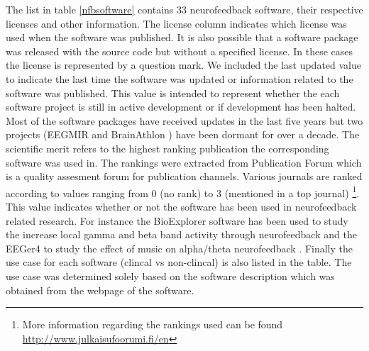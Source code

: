 The list in table \ref{nfbsoftware} contains 33 neurofeedback software, their respective licenses and other information. The license column indicates which license was used when the software was published. It is also possible that a software package was released with the source code but without a specified license. In these cases the license is represented by a question mark. We included the last updated value to indicate the last time the software was updated or information related to the software was published. This value is intended to represent whether the each software project is still in active development or if development has been halted. Most of the software packages have received updates in the last five years but two projects (EEGMIR and BrainAthlon \cite{palke2004brainathlon}) have been dormant for over a decade. The scientific merit refers to the highest ranking publication the corresponding software was used in. The rankings were extracted from Publication Forum which is a quality assesment forum for publication channels. Various journals are ranked according to values ranging from 0 (no rank) to 3 (mentioned in a top journal) \footnote{More information regarding the rankings used can be found \url{http://www.julkaisufoorumi.fi/en}}. This value indicates whether or not the software has been used in neurofeedback related research. For instance the BioExplorer software has been used to study the increase local gamma and beta band activity through neurofeedback \cite{keizer2010enhancing} and the EEGer4 to study the effect of music on alpha/theta neurofeedback \cite{gruzelier2014replication}. Finally the use case for each software (clincal vs non-clincal) is also listed in the table. The use case was determined solely based on the software description which was obtained from the webpage of the software.

